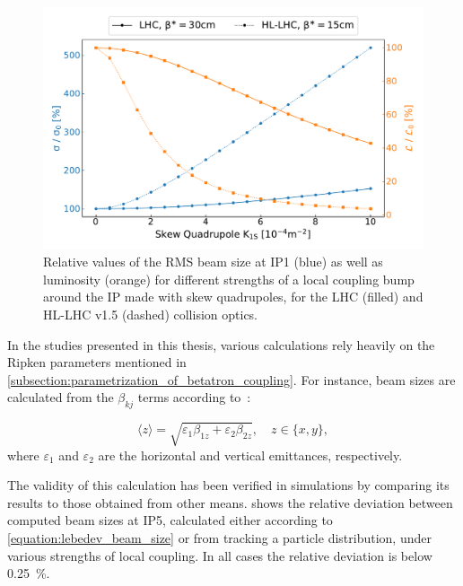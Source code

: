 \begin{figure}[!htb]
    \centering
    \includegraphics*[width=\columnwidth]{Figures/IR_Coupling_Correction/lhc_vs_hllhc_combined.pdf}
    \caption{Relative values of the RMS beam size at IP\num{1} (\textcolor{mplblue}{blue}) as well as luminosity (\textcolor{mplorange}{orange}) for different strengths of a local coupling bump around the IP made with skew quadrupoles, for the LHC (filled) and HL-LHC v1.5 (dashed) collision optics.}%
    \label{figure:lhc_vs_hllhc_beam_size_and_lumi_growths}
\end{figure}

In the studies presented in this thesis, various calculations rely heavily on the Ripken parameters mentioned in \cref{subsection:parametrization_of_betatron_coupling}.
For instance, beam sizes are calculated from the \(\beta_{kj}\) terms according to~\cite{IOP:Lebedev:Betatron_Motion_Coupling}:

\begin{equation}
    \langle z \rangle = \sqrt{\varepsilon_1 \beta_{1z} + \varepsilon_2 \beta_{2z}}, \quad z \in\{x, y\} ,
    \label{equation:lebedev_beam_size}
\end{equation}
where \(\varepsilon_1\) and \(\varepsilon_2\) are the horizontal and vertical emittances, respectively.

The validity of this calculation has been verified in simulations by comparing its results to those obtained from other means.
 shows the relative deviation between computed beam sizes at IP\num{5}, calculated either according to \cref{equation:lebedev_beam_size} or from tracking a particle distribution, under various strengths of local coupling.
In all cases the relative deviation is below \qty{0.25}{\percent}.

